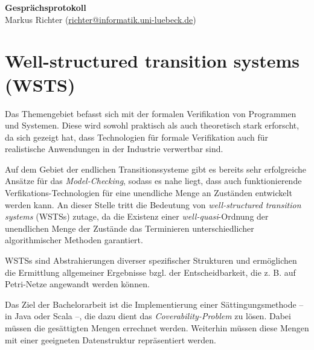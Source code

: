 \documentclass[
  a4paper,               %
  twoside,               %
  headings=small,        %
  DIV=12,                %
  BCOR=1cm,              %
  headinclude=true,      %
  footinclude=true,      %
  numbers=noenddot,      %
  11pt]{scrartcl}        %
\begin{document}
\begin{center}
\textbf{\huge Gesprächsprotokoll} \\[1em]
Markus Richter (\url{richter@informatik.uni-luebeck.de})
\end{center}


\section*{Well-structured transition systems (WSTS)}
Das Themengebiet befasst sich mit der formalen Verifikation von Programmen und Systemen. Diese wird sowohl praktisch als auch theoretisch stark erforscht, da sich gezeigt hat, dass Technologien für formale Verifikation auch für realistische Anwendungen in der Industrie verwertbar sind. 

Auf dem Gebiet der endlichen Transitionssysteme gibt es bereits sehr erfolgreiche Ansätze für das \emph{Model-Checking}, sodass es nahe liegt, dass auch funktionierende Verfikations-Technologien für eine unendliche Menge an Zuständen entwickelt werden kann. An dieser Stelle tritt die Bedeutung von \emph{well-structured transition systems} (WSTSs) zutage, da die Existenz einer \emph{well-quasi}-Ordnung der unendlichen Menge der Zustände das Terminieren unterschiedlicher algorithmischer Methoden garantiert. 

WSTSs sind Abstrahierungen diverser spezifischer Strukturen und ermöglichen die Ermittlung allgemeiner Ergebnisse bzgl. der Entscheidbarkeit, die z. B. auf Petri-Netze angewandt werden können. 

Das Ziel der Bachelorarbeit ist die Implementierung einer Sättingungsmethode -- in Java oder Scala --, die dazu dient das \emph{Coverability-Problem} zu lösen. Dabei müssen die gesättigten Mengen errechnet werden. Weiterhin müssen diese Mengen mit einer geeigneten Datenstruktur repräsentiert werden. 
\end{document}
